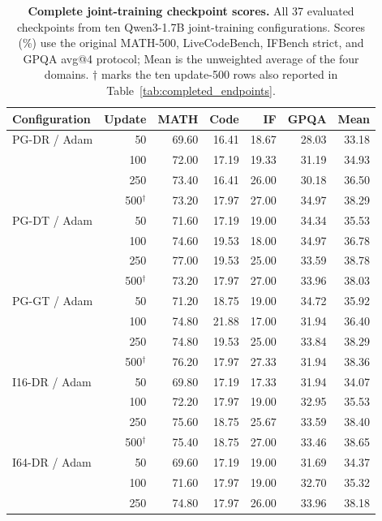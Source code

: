 \begin{table}[p]
\centering
\caption{\textbf{Complete joint-training checkpoint scores.} All 37 evaluated checkpoints from ten Qwen3-1.7B joint-training configurations. Scores (\%) use the original MATH-500, LiveCodeBench, IFBench strict, and GPQA avg@4 protocol; Mean is the unweighted average of the four domains. $\dagger$ marks the ten update-500 rows also reported in Table~\ref{tab:completed_endpoints}.}
\label{tab:qwen_all_checkpoints}
\begingroup
\footnotesize
\setlength{\tabcolsep}{5pt}
\renewcommand{\arraystretch}{1.02}
\begin{tabular}{lrrrrrr}
\toprule
Configuration & Update & MATH & Code & IF & GPQA & Mean \\
\midrule
PG-DR / Adam & 50 & 69.60 & 16.41 & 18.67 & 28.03 & 33.18 \\
 & 100 & 72.00 & 17.19 & 19.33 & 31.19 & 34.93 \\
 & 250 & 73.40 & 16.41 & 26.00 & 30.18 & 36.50 \\
 & 500$^{\dagger}$ & 73.20 & 17.97 & 27.00 & 34.97 & 38.29 \\
\addlinespace[2pt]
PG-DT / Adam & 50 & 71.60 & 17.19 & 19.00 & 34.34 & 35.53 \\
 & 100 & 74.60 & 19.53 & 18.00 & 34.97 & 36.78 \\
 & 250 & 77.00 & 19.53 & 25.00 & 33.59 & 38.78 \\
 & 500$^{\dagger}$ & 73.20 & 17.97 & 27.00 & 33.96 & 38.03 \\
\addlinespace[2pt]
PG-GT / Adam & 50 & 71.20 & 18.75 & 19.00 & 34.72 & 35.92 \\
 & 100 & 74.80 & 21.88 & 17.00 & 31.94 & 36.40 \\
 & 250 & 74.80 & 19.53 & 25.00 & 33.84 & 38.29 \\
 & 500$^{\dagger}$ & 76.20 & 17.97 & 27.33 & 31.94 & 38.36 \\
\addlinespace[2pt]
I16-DR / Adam & 50 & 69.80 & 17.19 & 17.33 & 31.94 & 34.07 \\
 & 100 & 72.20 & 17.97 & 19.00 & 32.95 & 35.53 \\
 & 250 & 75.60 & 18.75 & 25.67 & 33.59 & 38.40 \\
 & 500$^{\dagger}$ & 75.40 & 18.75 & 27.00 & 33.46 & 38.65 \\
\addlinespace[2pt]
I64-DR / Adam & 50 & 69.60 & 17.19 & 19.00 & 31.69 & 34.37 \\
 & 100 & 71.60 & 17.97 & 19.00 & 32.70 & 35.32 \\
 & 250 & 74.80 & 17.97 & 26.00 & 33.96 & 38.18 \\

\end{tabular}
\end{table}

